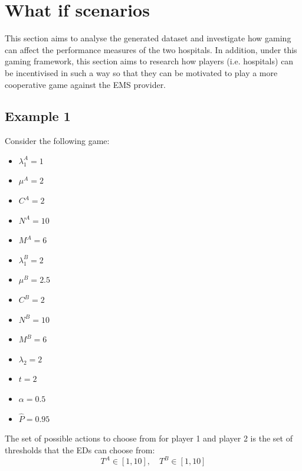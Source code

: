 \section{What if scenarios}\label{sec:results_what_if}

This section aims to analyse the generated dataset and investigate how
gaming can affect the performance measures of the two hospitals.
In addition, under this gaming framework, this section aims to research how
players (i.e. hospitals) can be incentivised in such a way so that they can be
motivated to play a more cooperative game against the EMS provider.


\subsection{Example 1}

Consider the following game:

\begin{multicols}{3}
    \begin{itemize}
        \item \( \lambda_1^A = 1 \)
        \item \( \mu^A = 2 \)
        \item \( C^A = 2 \)
        \item \( N^A = 10 \)
        \item \( M^A = 6 \)
        \columnbreak

        \item \( \lambda_1^B = 2 \)
        \item \( \mu^B = 2.5 \)
        \item \( C^B = 2 \)
        \item \( N^B = 10 \)
        \item \( M^B = 6 \)
        \columnbreak

        \item \( \lambda_2 = 2 \)
        \item \( t = 2 \)
        \item \( \alpha = 0.5 \)
        \item \( \hat{P} = 0.95 \)
    \end{itemize}
\end{multicols}

The set of possible actions to choose from for player 1 and player 2 is the
set of thresholds that the EDs can choose from: 
\begin{equation}
    T^A \in [1, 10], \quad T^B \in [1, 10]
\end{equation}

